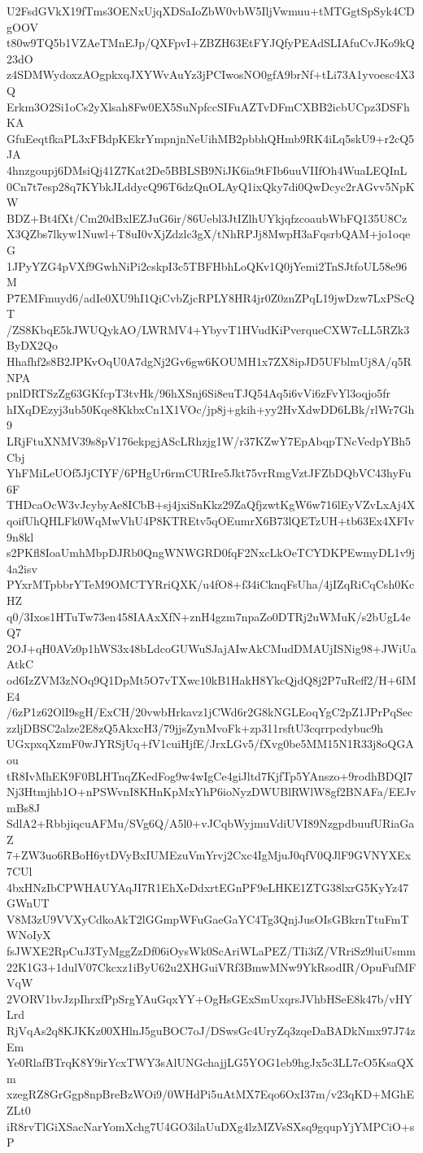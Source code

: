 U2FsdGVkX19fTms3OENxUjqXDSaIoZbW0vbW5IljVwmuu+tMTGgtSpSyk4CDgOOV
t80w9TQ5b1VZAeTMnEJp/QXFpvI+ZBZH63EtFYJQfyPEAdSLIAfuCvJKo9kQ23dO
z4SDMWydoxzAOgpkxqJXYWvAuYz3jPCIwosNO0gfA9brNf+tLi73A1yvoesc4X3Q
Erkm3O2Si1oCs2yXlsah8Fw0EX5SuNpfccSIFuAZTvDFmCXBB2icbUCpz3DSFhKA
GfuEeqtfkaPL3xFBdpKEkrYmpnjnNeUihMB2pbbhQHmb9RK4iLq5skU9+r2cQ5JA
4hnzgoupj6DMsiQj41Z7Kat2De5BBLSB9NiJK6ia9tFIb6uuVIIfOh4WuaLEQInL
0Cn7t7esp28q7KYbkJLddycQ96T6dzQnOLAyQ1ixQky7di0QwDcyc2rAGvv5NpKW
BDZ+Bt4fXt/Cm20dBxlEZJuG6ir/86Uebl3JtIZlhUYkjqfzcoaubWbFQ135U8Cz
X3QZbs7lkyw1Nuwl+T8uI0vXjZdzlc3gX/tNhRPJj8MwpH3aFqsrbQAM+jo1oqeG
1JPyYZG4pVXf9GwhNiPi2cskpI3c5TBFHbhLoQKv1Q0jYemi2TnSJtfoUL58e96M
P7EMFmuyd6/adIe0XU9hI1QiCvbZjcRPLY8HR4jr0Z0znZPqL19jwDzw7LxPScQT
/ZS8KbqE5kJWUQykAO/LWRMV4+YbyvT1HVudKiPverqueCXW7cLL5RZk3ByDX2Qo
Hhafhf2s8B2JPKvOqU0A7dgNj2Gv6gw6KOUMH1x7ZX8ipJD5UFblmUj8A/q5RNPA
pnlDRTSzZg63GKfcpT3tvHk/96hXSnj6Si8euTJQ54Aq5i6vVi6zFvYl3oqjo5fr
hIXqDEzyj3ub50Kqe8KkbxCn1X1VOc/jp8j+gkih+yy2HvXdwDD6LBk/rlWr7Gh9
LRjFtuXNMV39s8pV176ekpgjAScLRhzjg1W/r37KZwY7EpAbqpTNcVedpYBh5Cbj
YhFMiLeUOf5JjCIYF/6PHgUr6rmCURIre5Jkt75vrRmgVztJFZbDQbVC43hyFu6F
THDcaOcW3vJcybyAe8ICbB+sj4jxiSnKkz29ZaQfjzwtKgW6w716lEyVZvLxAj4X
qoifUhQHLFk0WqMwVhU4P8KTREtv5qOEumrX6B73lQETzUH+tb63Ex4XFIv9n8kl
s2PKfl8IoaUmhMbpDJRb0QngWNWGRD0fqF2NxcLkOeTCYDKPEwmyDL1v9j4a2isv
PYxrMTpbbrYTeM9OMCTYRriQXK/u4fO8+f34iCknqFsUha/4jIZqRiCqCsh0KcHZ
q0/3Ixos1HTuTw73en458IAAxXfN+znH4gzm7npaZo0DTRj2uWMuK/s2bUgL4eQ7
2OJ+qH0AVz0p1hWS3x48bLdcoGUWuSJajAIwAkCMudDMAUjISNig98+JWiUaAtkC
od6IzZVM3zNOq9Q1DpMt5O7vTXwc10kB1HakH8YkcQjdQ8j2P7uReff2/H+6IME4
/6zP1z62OlI9sgH/ExCH/20vwbHrkavz1jCWd6r2G8kNGLEoqYgC2pZ1JPrPqSec
zzljDBSC2alze2E8zQ5AkxcH3/79jjsZynMvoFk+zp311rsftU3cqrrpcdybuc9h
UGxpxqXzmF0wJYRSjUq+fV1cuiHjfE/JrxLGv5/fXvg0be5MM15N1R33j8oQGAou
tR8IvMhEK9F0BLHTnqZKedFog9w4wIgCe4giJltd7KjfTp5YAnszo+9rodhBDQI7
Nj3Htmjhb1O+nPSWvnI8KHnKpMxYhP6ioNyzDWUBlRWlW8gf2BNAFa/EEJvmBs8J
SdlA2+RbbjiqcuAFMu/SVg6Q/A5l0+vJCqbWyjmuVdiUVI89NzgpdbuufURiaGaZ
7+ZW3uo6RBoH6ytDVyBxIUMEzuVmYrvj2Cxc4IgMjuJ0qfV0QJlF9GVNYXEx7CUl
4bxHNzIbCPWHAUYAqJI7R1EhXeDdxrtEGnPF9eLHKE1ZTG38lxrG5KyYz47GWnUT
V8M3zU9VVXyCdkoAkT2lGGmpWFuGaeGaYC4Tg3QnjJusOIsGBkrnTtuFmTWNoIyX
fsJWXE2RpCuJ3TyMggZzDf06iOysWk0ScAriWLaPEZ/TIi3iZ/VRriSz9luiUsmm
22K1G3+1dulV07Ckcxz1iByU62u2XHGuiVRf3BmwMNw9YkRsodIR/OpuFufMFVqW
2VORV1bvJzpIhrxfPpSrgYAuGqxYY+OgHsGExSmUxqrsJVhbHSeE8k47b/vHYLrd
RjVqAs2q8KJKKz00XHlnJ5guBOC7oJ/DSwsGc4UryZq3zqeDaBADkNmx97J74zEm
Ye0RlafBTrqK8Y9irYcxTWY3sAlUNGchajjLG5YOG1eb9hgJx5c3LL7cO5KsaQXm
xzegRZ8GrGgp8npBreBzWOi9/0WHdPi5uAtMX7Eqo6OxI37m/v23qKD+MGhEZLt0
iR8rvTlGiXSacNarYomXchg7U4GO3ilaUuDXg4lzMZVsSXsq9gqupYjYMPCiO+sP
